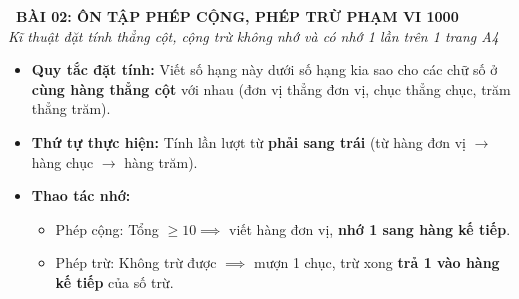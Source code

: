 \documentclass[12pt,a4paper]{article}
\begin{document}
\begin{tcolorbox}[
  enhanced,
  colback=teal!8!white,
  colframe=teal!70!black,
  arc=3mm, boxrule=1.2pt,
  left=3mm, right=3mm, top=2mm, bottom=2mm,
  halign=center
]
  {\LARGE\bfseries\color{teal!90!black}\faBookmark\ BÀI 02: ÔN TẬP PHÉP CỘNG, PHÉP TRỪ PHẠM VI 1000}\\[1mm]
  {\itshape\footnotesize\color{black!75} Kĩ thuật đặt tính thẳng cột, cộng trừ không nhớ và có nhớ 1 lần trên 1 trang A4}
\end{tcolorbox}

\vspace{-2mm}

\noindent
\begin{minipage}[t]{0.49\textwidth}\vspace{0pt}
\begin{tcolorbox}[
  enhanced,
  colback=blue!4!white,
  colframe=blue!75!black,
  arc=2mm, boxrule=0.8pt,
  left=2mm, right=2mm, top=1.8mm, bottom=1.8mm,
  title={\footnotesize\bfseries\color{white}\faPlusSquare\ 1. Kĩ thuật Đặt tính rồi tính}
]
{\footnotesize
\begin{itemize}\setlength{\itemsep}{1pt}\setlength{\leftskip}{-2.5mm}
  \item \textbf{Quy tắc đặt tính:} Viết số hạng này dưới số hạng kia sao cho các chữ số ở \textbf{cùng hàng thẳng cột} với nhau (đơn vị thẳng đơn vị, chục thẳng chục, trăm thẳng trăm).
  \item \textbf{Thứ tự thực hiện:} Tính lần lượt từ \textbf{phải sang trái} (từ hàng đơn vị $\to$ hàng chục $\to$ hàng trăm).
  \item \textbf{Thao tác nhớ:}
  \begin{itemize}\setlength{\itemsep}{0.5pt}\setlength{\leftskip}{-2.5mm}
    \item Phép cộng: Tổng $\ge 10 \implies$ viết hàng đơn vị, \textbf{nhớ 1 sang hàng kế tiếp}.
    \item Phép trừ: Không trừ được $\implies$ mượn 1 chục, trừ xong \textbf{trả 1 vào hàng kế tiếp} của số trừ.
  \end{itemize}
\end{itemize}
}
\end{tcolorbox}
\end{minipage}
\hfill
\end{document}
